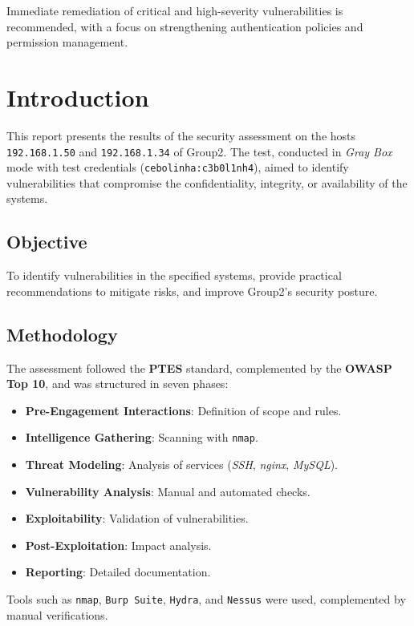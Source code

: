 \documentclass[a4paper,12pt]{article}
\begin{document}
Immediate remediation of critical and high-severity vulnerabilities is recommended, with a focus on strengthening authentication policies and permission management.

\section{Introduction}
This report presents the results of the security assessment on the hosts \texttt{192.168.1.50} and \texttt{192.168.1.34} of Group2. The test, conducted in \textit{Gray Box} mode with test credentials (\texttt{cebolinha:c3b0l1nh4}), aimed to identify vulnerabilities that compromise the confidentiality, integrity, or availability of the systems.

\subsection{Objective}
To identify vulnerabilities in the specified systems, provide practical recommendations to mitigate risks, and improve Group2's security posture.

\subsection{Methodology}
The assessment followed the \textbf{PTES} standard, complemented by the \textbf{OWASP Top 10}, and was structured in seven phases:
\begin{itemize}
    \item \textbf{Pre-Engagement Interactions}: Definition of scope and rules.
    \item \textbf{Intelligence Gathering}: Scanning with \texttt{nmap}.
    \item \textbf{Threat Modeling}: Analysis of services (\textit{SSH}, \textit{nginx}, \textit{MySQL}).
    \item \textbf{Vulnerability Analysis}: Manual and automated checks.
    \item \textbf{Exploitability}: Validation of vulnerabilities.
    \item \textbf{Post-Exploitation}: Impact analysis.
    \item \textbf{Reporting}: Detailed documentation.
\end{itemize}

Tools such as \texttt{nmap}, \texttt{Burp Suite}, \texttt{Hydra}, and \texttt{Nessus} were used, complemented by manual verifications.
\end{document}
